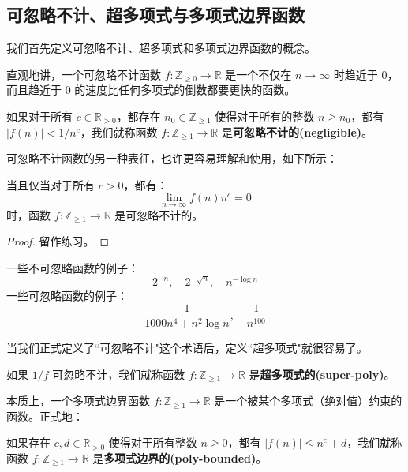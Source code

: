 \subsection{可忽略不计、超多项式与多项式边界函数}

我们首先定义可忽略不计、超多项式和多项式边界函数的概念。

直观地讲，一个可忽略不计函数 $f:\mathbb{Z}_{\geq0}\to\mathbb{R}$ 是一个不仅在 $n\to\infty$ 时趋近于 $0$，而且趋近于 $0$ 的速度比任何多项式的倒数都要更快的函数。

\begin{definition}\label{def:2-5}
如果对于所有 $c\in\mathbb{R}_{>0}$，都存在 $n_0\in\mathbb{Z}_{\geq 1}$ 使得对于所有的整数 $n\geq n_0$，都有 $|f(n)|<{1}/{n^c}$，我们就称函数 $f:\mathbb{Z}_{\geq1}\to\mathbb{R}$ 是\textbf{可忽略不计的(negligible)}。
\end{definition}

可忽略不计函数的另一种表征，也许更容易理解和使用，如下所示：

\begin{theorem}
当且仅当对于所有 $c>0$，都有：
\[
\lim_{n\to\infty}f(n)n^c=0
\]
时，函数 $f:\mathbb{Z}_{\geq1}\to\mathbb{R}$ 是可忽略不计的。
\end{theorem}

\begin{proof}
留作练习。
\end{proof}

\begin{example}
一些不可忽略函数的例子：
\[
2^{-n},
\quad
2^{-\sqrt{n}},
\quad
n^{-\log n}
\]
一些可忽略函数的例子：
\[
\frac{1}{1000n^4+n^2\log n},
\quad
\frac{1}{n^{100}}
\]
\end{example}

当我们正式定义了``可忽略不计"这个术语后，定义``超多项式"就很容易了。

\begin{definition}
如果 ${1}/{f}$ 可忽略不计，我们就称函数 $f:\mathbb{Z}_{\geq1}\to\mathbb{R}$ 是\textbf{超多项式的(super-poly)}。
\end{definition}

本质上，一个多项式边界函数 $f:\mathbb{Z}_{\geq1}\to\mathbb{R}$ 是一个被某个多项式（绝对值）约束的函数。正式地：

\begin{definition}
如果存在 $c,d\in\mathbb{R}_{>0}$ 使得对于所有整数 $n\geq0$，都有 $|f(n)|\leq n^c+d$，我们就称函数 $f:\mathbb{Z}_{\geq1}\to\mathbb{R}$ 是\textbf{多项式边界的(poly-bounded)}。
\end{definition}

